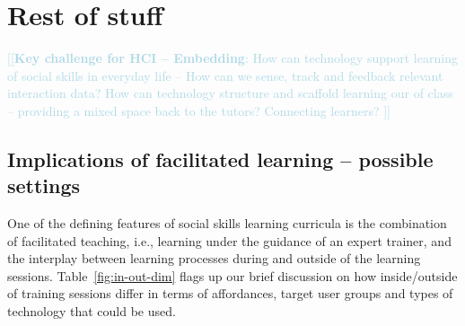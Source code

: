 \documentclass[prodmode,acmtochi]{acmsmall}
\newcommand{\todo}[1]{\textrm{\textrm{\textcolor{LightBlue}{[[#1]]} } } }
\newcommand{\rephrase}[1]{\textrm{\textrm{\textcolor{gray}{#1}}}}
\begin{document}
        
 






\section{Rest of stuff}



\todo{{\bf Key challenge for HCI -- Embedding}: How can technology support learning of social skills in everyday life -- How can we sense, track and feedback relevant interaction data? How can technology structure and scaffold learning our of class -- providing a mixed space back to the tutors? Connecting learners? }
\subsection{Implications of facilitated learning -- possible settings}
\label{sec:facilitated}

One of the defining features of social skills learning curricula is the combination of facilitated teaching, i.e., learning under the guidance of an expert trainer, and the interplay between learning processes during and outside of the learning sessions. 
Table~\ref{fig:in-out-dim} flags up our brief discussion on how inside/outside of training sessions differ in terms of affordances, target user groups and types of technology that could be used. 
\end{document}

